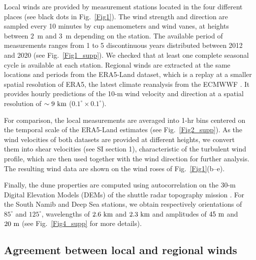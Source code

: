   Local winds are provided by measurement stations located in the four different places (see black dots in Fig.~\ref{Fig1}). The wind strength and direction are sampled every 10 minutes by cup anemometers and wind vanes, at heights between $2$~m and $3$~m depending on the station. The available period of measurements ranges from 1 to 5 discontinuous years distributed between 2012 and 2020 (see Fig.~\ref{Fig1_supp}). We checked that at least one complete seasonal cycle is available at each station.
  Regional winds are extracted at the same locations and periods from the ERA5-Land dataset, which is a replay at a smaller spatial resolution of ERA5, the latest climate reanalysis from the ECMWWF \citep{Hersbach2020, munoz2021}. It provides hourly predictions of the 10-m wind velocity and direction at a spatial resolution of $\sim 9~\textup{km}$ ($0.1^\circ\times0.1^\circ$).


  For comparison, the local measurements are averaged into 1-hr bins centered on the temporal scale of the ERA5-Land estimates (see Fig.~\ref{Fig2_supp}). As the wind velocities of both datasets are provided at different heights, we convert them into shear velocities (see SI section 1), characteristic of the turbulent wind profile, which are then used together with the wind direction for further analysis. The resulting wind data are shown on the wind roses of Fig.~\ref{Fig1}(b--e).

  Finally, the dune properties are computed using autocorrelation on the 30-m Digital Elevation Models (DEMs) of the shuttle radar topography mission \citep{Farr2007}. For the South Namib and Deep Sea stations, we obtain respectively orientations of $85^\circ$ and $125^\circ$, wavelengths of $2.6~\textup{km}$ and $2.3~\textup{km}$ and amplitudes of $45~\textup{m}$ and $20~\textup{m}$ (see Fig.~\ref{Fig4_supp} for more details).

  \subsection{Agreement between local and regional winds}

